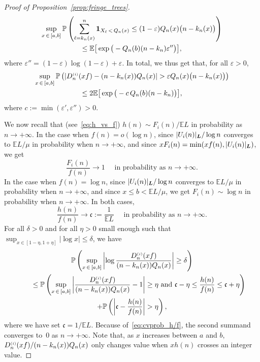 \documentclass[10pt]{amsart}
\theoremstyle{definition}\newtheorem{defi}[theo]{Definition}\newtheorem{rema}[theo]{Remark}\newtheorem{exam}[theo]{Example}\newtheorem{exem}[theo]{Example}\newtheorem{nota}[theo]{Notation}
\newcommand{\bs}{\ensuremath{\boldsymbol}}
\newcommand{\sss}{\ensuremath{\scriptscriptstyle}}
\newcommand{\bbP}{\mathbb{P}}
\newcommand{\bbE}{\mathbb{E}}
\newcommand{\frkc}{\mathfrak{c}}
\begin{document}
\begin{proof}[Proof of Proposition~\ref{prop:fringe_trees}]
\begin{multline*}
\sup_{x\,\in\,[a,b]}\bbP\left(\sum_{\ell=k_n(x)}^n \bs1_{X_\ell\,<\,Q_n(x)}\leq (1-\varepsilon)Q_n(x)\big(n-k_n(x)\big)\right)\\
\leq\bbE\big[\exp\big(-Q_n(b)(n-k_n)\varepsilon''\big)\big],
\end{multline*}
where $\varepsilon''=(1-\varepsilon)\log(1-\varepsilon)+\varepsilon.$ In total, we thus get that, for all $\varepsilon>0$,
\begin{multline}\label{eq:LDP}
\sup_{x\,\in\,[a,b]}\bbP\left(\left|D_n^{\sss (i)}(xf)-(n-k_n(x))Q_n(x)\right|>\varepsilon Q_n(x)\big(n-k_n(x)\big)\right) \\
\leq 2\bbE\big[\exp\big(-c\,Q_n(b)(n-k_n)\big)\big],
\end{multline}
where $c:=\min(\varepsilon', \varepsilon'')>0$.

We now recall that (see~\eqref{eq:h_vs_f}) $h(n) \sim F_i(n)/\bbE L$ in probability as $n\to+\infty$. In the case when $f(n) = o(\log n)$, since $|U_i(n)|_{\bs L}/\log n$ converges to {$\bbE L/\mu$} in probability when $n\to+\infty$, and since $xF_i(n) = \min(xf(n), |U_i(n)|_{\bs L})$, we get
\begin{equation}\label{eq:cvprob_Fi/f}
\frac{F_i(n)}{f(n)}\to 1 \quad \text{ in probability as }n\to+\infty.
\end{equation}
In the case when $f(n) = \log n$, since $|U_i(n)|_{\bs L}/\log n$ converges to {$\bbE L/\mu$} in probability when $n\to+\infty$, and since $x\leq b<{\bbE L/\mu}$, we get $F_i(n)\sim \log n$ in probability when $n\to+\infty$. In both cases,
\begin{equation}\label{eq:cvprob_h/f}
\frac{h(n)}{f(n)}\to \frkc := \frac1{\bbE L}\quad \text{ in probability as }n\to+\infty.
\end{equation}
For all $\delta>0$ and for all $\eta>0$ small enough such that $\sup_{x\in [1-\eta, 1+\eta]}|\log x|\leq \delta$, we have
\begin{multline}\label{eq:prob}
\bbP\left(\sup_{x\,\in\,[a,b]}\left|\log \frac{D_n^{\sss (i)}(xf)}{(n-k_n(x))Q_n(x)}\right|\geq\delta\right)\\
\qquad\leq\bbP\left(\sup_{x\,\in\,[a,b]}\left|
\frac{D_n^{\sss (i)}(xf)}{(n-k_n(x))Q_n(x)}-1\right|\geq\eta
\text{ and } \frkc-\eta\leq \frac{h(n)}{f(n)}\leq\frkc+\eta\right)\\
+ \bbP\left(\left|\frkc-\frac{h(n)}{f(n)}\right|>\eta\right),
\end{multline}
where we have set $\frkc = 1/\bbE L$. Because of~\eqref{eq:cvprob_h/f}, the second summand converges to~0 as $n\to+\infty$. Note that, as $x$ increases between $a$ and $b$, ${D_n^{\sss (i)}(xf)}/{(n-k_n(x))Q_n(x)}$ only changes value when $xh(n)$ crosses an integer value.


\end{proof}
\end{document}
